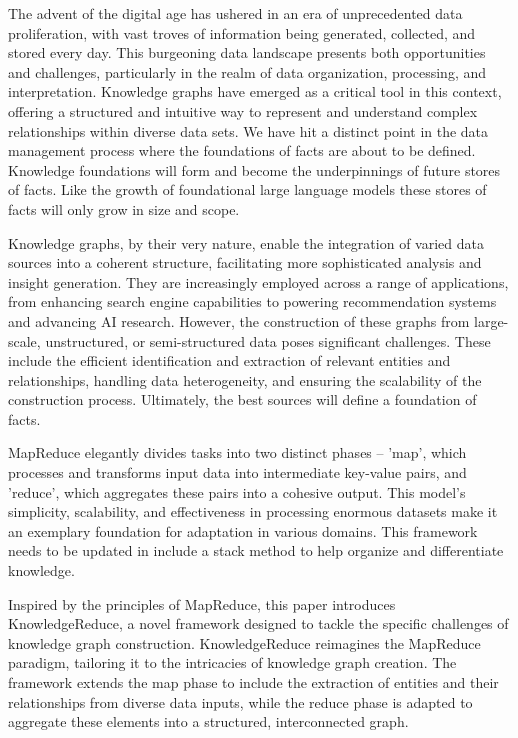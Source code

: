 \documentclass{article}
\begin{document}
The advent of the digital age has ushered in an era of unprecedented data proliferation, with vast troves of information being generated, collected, and stored every day. This burgeoning data landscape presents both opportunities and challenges, particularly in the realm of data organization, processing, and interpretation. Knowledge graphs have emerged as a critical tool in this context, offering a structured and intuitive way to represent and understand complex relationships within diverse data sets. We have hit a distinct point in the data management process where the foundations of facts are about to be defined. Knowledge foundations will form and become the underpinnings of future stores of facts. Like the growth of foundational large language models these stores of facts will only grow in size and scope.

Knowledge graphs, by their very nature, enable the integration of varied data sources into a coherent structure, facilitating more sophisticated analysis and insight generation. They are increasingly employed across a range of applications, from enhancing search engine capabilities to powering recommendation systems and advancing AI research. However, the construction of these graphs from large-scale, unstructured, or semi-structured data poses significant challenges. These include the efficient identification and extraction of relevant entities and relationships, handling data heterogeneity, and ensuring the scalability of the construction process. Ultimately, the best sources will define a foundation of facts. 

MapReduce elegantly divides tasks into two distinct phases – 'map', which processes and transforms input data into intermediate key-value pairs, and 'reduce', which aggregates these pairs into a cohesive output. This model's simplicity, scalability, and effectiveness in processing enormous datasets make it an exemplary foundation for adaptation in various domains. This framework needs to be updated in include a stack method to help organize and differentiate knowledge.

Inspired by the principles of MapReduce, this paper introduces KnowledgeReduce, a novel framework designed to tackle the specific challenges of knowledge graph construction. KnowledgeReduce reimagines the MapReduce paradigm, tailoring it to the intricacies of knowledge graph creation. The framework extends the map phase to include the extraction of entities and their relationships from diverse data inputs, while the reduce phase is adapted to aggregate these elements into a structured, interconnected graph.
\end{document}
